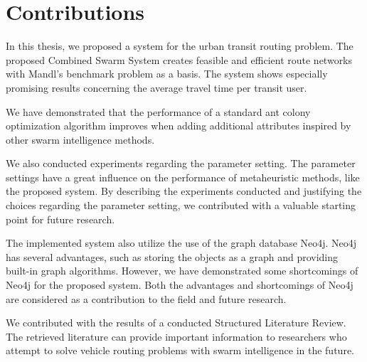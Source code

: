 \section{Contributions}
\label{sec:contributions}

%

In this thesis, we proposed a system for the urban transit routing problem. The proposed Combined Swarm System creates feasible and efficient route networks with Mandl's benchmark problem\citep{mandl79} as a basis. The system shows especially promising results concerning the average travel time per transit user. 

We have demonstrated that the performance of a standard ant colony optimization algorithm improves when adding additional attributes inspired by other swarm intelligence methods. 

We also conducted experiments regarding the parameter setting. The parameter settings have a great influence on the performance of metaheuristic methods, like the proposed system. By describing the experiments conducted and justifying the choices regarding the parameter setting, we contributed with a valuable starting point for future research. 

The implemented system also utilize the use of the graph database Neo4j. Neo4j has several advantages, such as storing the objects as a graph and providing built-in graph algorithms. However, we have demonstrated some shortcomings of Neo4j for the proposed system. Both the advantages and shortcomings of Neo4j are considered as a contribution to the field and future research. 

We contributed with the results of a conducted Structured Literature Review. The retrieved literature can provide important information to researchers who attempt to solve vehicle routing problems with swarm intelligence in the future. 




